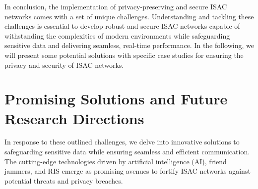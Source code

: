 \documentclass[10pt,journal,twocolumn,twoside]{IEEEtran} %
\begin{document}

In conclusion, the implementation of privacy-preserving and secure ISAC networks comes with a set of unique challenges. Understanding and tackling these challenges is essential to develop robust and secure ISAC networks capable of withstanding the complexities of modern environments while safeguarding sensitive data and delivering seamless, real-time performance. In the following, we will present some potential solutions with specific case studies for ensuring the privacy and security of ISAC networks.

\section{Promising Solutions and Future Research Directions} 
In response to these outlined challenges, we delve into innovative solutions to safeguarding sensitive data while ensuring seamless and efficient communication. The cutting-edge technologies driven by artificial intelligence (AI), friend jammers, and RIS emerge as promising avenues to fortify ISAC networks against potential threats and privacy breaches.
\end{document}
